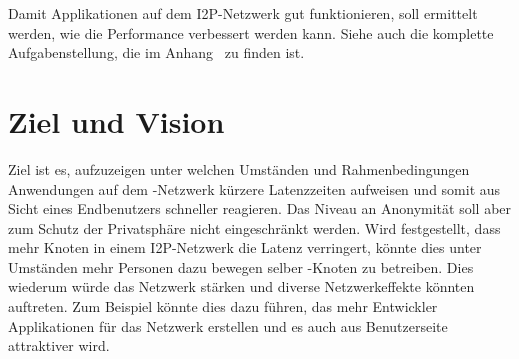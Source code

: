 Damit Applikationen auf dem I2P-Netzwerk gut funktionieren, soll ermittelt werden, wie die Performance
verbessert werden kann.
Siehe auch die komplette Aufgabenstellung, die im Anhang~ zu finden ist.

\section{Ziel und Vision}\label{sec:ziel}

Ziel ist es, aufzuzeigen unter welchen Umständen und Rahmenbedingungen Anwendungen auf dem -Netzwerk kürzere Latenzzeiten aufweisen
und somit aus Sicht eines Endbenutzers schneller reagieren.
Das Niveau an Anonymität soll aber zum Schutz der Privatsphäre nicht eingeschränkt werden.
Wird festgestellt, dass mehr Knoten in einem I2P-Netzwerk die Latenz verringert,
könnte dies unter Umständen mehr Personen dazu bewegen selber -Knoten zu betreiben.
Dies wiederum würde das Netzwerk stärken und diverse Netzwerkeffekte könnten auftreten.
Zum Beispiel könnte dies dazu führen, das mehr Entwickler Applikationen für das Netzwerk erstellen und es auch aus Benutzerseite attraktiver wird.

